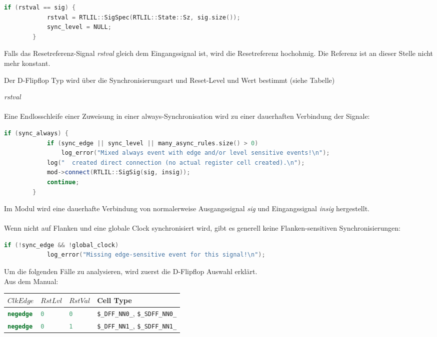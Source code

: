 \documentclass[11pt]{report}
\begin{document}
\begin{enumerate}
\begin{lstlisting}[language=C++]
		if (rstval == sig) {
			rstval = RTLIL::SigSpec(RTLIL::State::Sz, sig.size());
			sync_level = NULL;
		}
\end{lstlisting}
Falls das Resetreferenz-Signal \textit{rstval} gleich dem Eingangssignal ist, wird die Resetreferenz hochohmig.
Die Referenz ist an dieser Stelle nicht mehr konstant.

Der D-Flipflop Typ wird über die Synchronisierungsart und Reset-Level und Wert bestimmt (siehe Tabelle)

\textit{rstval}\\
\\
Eine Endlosschleife einer Zuweisung in einer always-Synchronisation wird zu einer dauerhaften Verbindung der Signale:
\begin{lstlisting}[language=C++]
	if (sync_always) {
			if (sync_edge || sync_level || many_async_rules.size() > 0)
				log_error("Mixed always event with edge and/or level sensitive events!\n");
			log("  created direct connection (no actual register cell created).\n");
			mod->connect(RTLIL::SigSig(sig, insig));
			continue;
		}
\end{lstlisting}
Im Modul wird eine dauerhafte Verbindung von normalerweise Ausgangssignal \textit{sig} und Eingangssignal \textit{insig} hergestellt.\\
\\
Wenn nicht auf Flanken und eine globale Clock synchronisiert wird, gibt es generell keine Flanken-sensitiven Synchronisierungen:
\begin{lstlisting}[language=C++]
		if (!sync_edge && !global_clock)
			log_error("Missing edge-sensitive event for this signal!\n");
\end{lstlisting}
Um die folgenden Fälle zu analysieren, wird zuerst die D-Flipflop Auswahl erklärt.\\
Aus dem Manual:
\begin{table}[h]
\hfil
\begin{tabular}[h]{llll}
$ClkEdge$ & $RstLvl$ & $RstVal$ & Cell Type \\
\hline
\lstinline[language=Verilog];negedge; & \lstinline[language=Verilog];0; & \lstinline[language=Verilog];0; & {\tt \$\_DFF\_NN0\_}, {\tt \$\_SDFF\_NN0\_} \\
\lstinline[language=Verilog];negedge; & \lstinline[language=Verilog];0; & \lstinline[language=Verilog];1; & {\tt \$\_DFF\_NN1\_}, {\tt \$\_SDFF\_NN1\_} \\

\end{tabular}
\end{table}
\end{enumerate}
\end{document}
